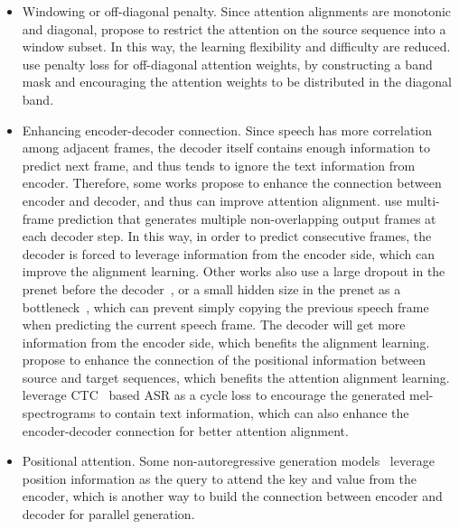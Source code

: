\documentclass{article}
\begin{document}
\begin{itemize}[leftmargin=*]
    \item Windowing or off-diagonal penalty. Since attention alignments are monotonic and diagonal, \citet{chorowski2015attention,tachibana2018efficiently,zhang2018forward,ping2018deep,chen2020multispeech} propose to restrict the attention on the source sequence into a window subset. In this way, the learning flexibility and difficulty are reduced. \citet{chen2020multispeech} use penalty loss for off-diagonal attention weights, by constructing a band mask and encouraging the attention weights to be distributed in the diagonal band. 
    \item Enhancing encoder-decoder connection. Since speech has more correlation among adjacent frames, the decoder itself contains enough information to predict next frame, and thus tends to ignore the text information from encoder. Therefore, some works propose to enhance the connection between encoder and decoder, and thus can improve attention alignment. \citet{wang2017tacotron,shen2018natural} use multi-frame prediction that generates multiple non-overlapping output frames at each decoder step. In this way, in order to predict consecutive frames, the decoder is forced to leverage information from the encoder side, which can improve the alignment learning. Other works also use a large dropout in the prenet before the decoder~\cite{wang2017tacotron,shen2018natural,chen2020multispeech}, or a small hidden size in the prenet as a bottleneck~\cite{chen2020multispeech}, which can prevent simply copying the previous speech frame when predicting the current speech frame. The decoder will get more information from the encoder side, which benefits the alignment learning. 
    \citet{ping2018deep,chen2020multispeech} propose to enhance the connection of the positional information between source and target sequences, which benefits the attention alignment learning. \citet{liu2019maximizing} leverage CTC~\cite{graves2006connectionist} based ASR as a cycle loss to encourage the generated mel-spectrograms to contain text information, which can also enhance the encoder-decoder connection for better attention alignment. 
    \item Positional attention. Some non-autoregressive generation models~\cite{peng2020non,miao2020flow} leverage position information as the query to attend the key and value from the encoder, which is another way to build the connection between encoder and decoder for parallel generation.
\end{itemize}
\end{document}
